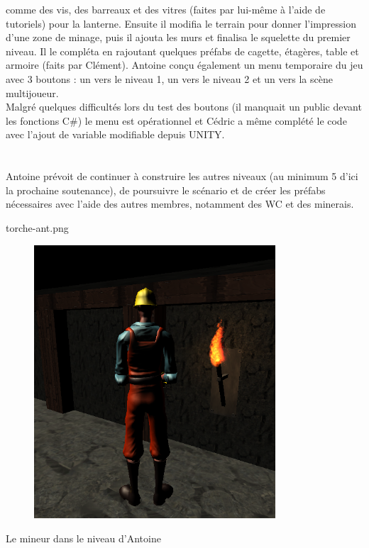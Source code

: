 \documentclass[titlepage, 13px, a4paper]{article}
\begin{document}
comme des vis, des barreaux et des vitres (faites par lui-même à l'aide de tutoriels) pour la lanterne. 
Ensuite il modifia le terrain pour donner l'impression d'une zone de minage, puis il ajouta les murs et 
finalisa le squelette du premier niveau. Il le compléta en rajoutant quelques préfabs de cagette, étagères, 
table et armoire (faits par Clément). Antoine conçu également un menu temporaire du jeu avec 3 boutons : 
un vers le niveau 1, un vers le niveau 2 et un vers la scène multijoueur. \\
Malgré quelques difficultés lors du test des boutons (il manquait un public devant les fonctions C\#) 
le menu est opérationnel et Cédric a même complété le code avec l'ajout de variable modifiable depuis UNITY.

\paragraph{} \hspace{0pt} \\
Antoine prévoit de continuer à construire les autres niveaux (au minimum 5 d'ici la prochaine soutenance), 
de poursuivre le scénario et de créer les préfabs nécessaires avec l'aide des autres membres, notamment des WC 
et des minerais.

torche-ant.png
\begin{center}
	\begin{figure}[!hp]
	   \includegraphics[width=9cm]{torche-ant.png}
	\end{figure}
	Le mineur dans le niveau d'Antoine
\end{center}
\end{document}
